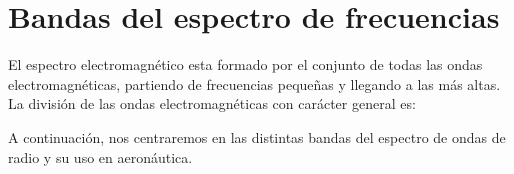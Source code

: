 \section{Bandas del espectro de frecuencias}
El espectro electromagnético esta formado por el conjunto de todas las ondas electromagnéticas, partiendo de frecuencias pequeñas y llegando a las más altas. La división de las ondas electromagnéticas con carácter general es:\\

\begin{table}[H]
\centering
{}
\vspace{0.3cm}
\caption{Bandas del espectro de ondas electromagnéticas}
\end{table}
A continuación, nos centraremos en las distintas bandas del espectro de ondas de radio y su uso en aeronáutica.\\


